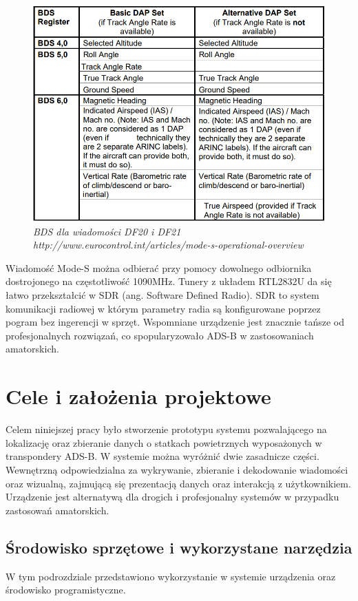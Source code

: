\documentclass[eng,printmode]{mgr}
\begin{document}
\begin{figure}[ph]
  \centering
  \includegraphics[width=\textwidth]{images/bds.png}
  \caption{\textit{ BDS dla wiadomości DF20 i DF21 \\http://www.eurocontrol.int/articles/mode-s-operational-overview}}
\end{figure}

Wiadomość Mode-S można odbierać przy pomocy dowolnego odbiornika dostrojonego na częstotliwość 1090MHz. Tunery z układem RTL2832U da się łatwo przekształcić w SDR (ang. Software Defined Radio).  SDR to system komunikacji radiowej w którym parametry radia są konfigurowane poprzez pogram bez ingerencji w sprzęt. Wspomniane urządzenie jest znacznie tańsze od profesjonalnych rozwiązań, co spopularyzowało ADS-B w zastosowaniach amatorskich. 



\chapter{ Cele i założenia projektowe }
Celem niniejszej pracy było stworzenie prototypu systemu pozwalającego na lokalizację oraz zbieranie danych o statkach powietrznych wyposażonych w transpondery ADS-B. W systemie można wyróżnić dwie zasadnicze części.
Wewnętrzną odpowiedzialna za wykrywanie, zbieranie i dekodowanie wiadomości oraz wizualną, zajmującą się prezentacją danych oraz interakcją z użytkownikiem. Urządzenie jest alternatywą dla drogich i profesjonalny systemów w przypadku zastosowań amatorskich.

\section{Środowisko sprzętowe i wykorzystane narzędzia}
W tym podrozdziale przedstawiono wykorzystanie w systemie urządzenia oraz środowisko programistyczne.
\\
\end{document}
